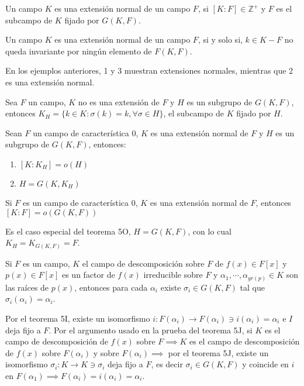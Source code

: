 \begin{definicion}
    Un campo $K$ es una extensión normal de un campo $F$, si $[K:F]\in \mathbb{Z}^+$ y $F$ es el subcampo de $K$ fijado por $G(K,F)$.
\end{definicion}

\begin{prop}
    Un campo $K$ es una extensión normal de un campo $F$, si y solo si, $k\in K-F$ no queda invariante por ningún elemento de $F(K,F)$. 
\end{prop}
\begin{ejemplo}
    En los ejemplos anteriores, 1 y 3 muestran extensiones normales, mientras que 2 es una extensión normal. 
\end{ejemplo}
\begin{cajita}
    Sea $F$ un campo, $K$ no es una extensión de $F$ y $H$ es un subgrupo de $G(K,F)$, entonces $K_H=\{k\in K:\sigma(k)=k,\forall \sigma \in H\}$, el subcampo de $K$ fijado por $H$. 
\end{cajita}

\begin{teorema}[5O]
    Sean $F$ un campo de característica 0, $K$ es una extensión normal de $F$ y $H$ es un subgrupo de $G(K,F)$, entonces: 
    \begin{enumerate}
        \item $[K:K_H]=o(H)$
        \item $H=G(K,K_H)$
    \end{enumerate}
    \begin{dem}
        
    \end{dem}
\end{teorema}

\begin{corolario}
    Si $F$ es un campo de característica 0, $K$ es una extensión normal de $F$, entonces $[K:F]=o(G(K,F))$
    \begin{dem}
        Es el caso especial del teorema 5O, $H=G(K,F)$, con lo cual $K_H=K_{G(K,F)}=F$.
    \end{dem}
\end{corolario}

\begin{lema}[5.9]
    Si $F$ es un campo, $K$ el campo de descomposición sobre $F$ de $f(x)\in F[x]$ y $p(x)\in F[x]$ es un factor de $f(x)$ irreducible sobre $F$ y $\alpha_1,\cdots,\alpha_{gr(p)}\in K$ son las raíces de $p(x)$, entonces para cada $\alpha_i$ existe $\sigma_i\in G(K,F)$ tal que $\sigma_i(\alpha_i)=\alpha_i$.
    \begin{dem}
        Por el teorema 5I, existe un isomorfismo $i:F(\alpha_i)\to F(\alpha_i)\ni i(\alpha_i)=\alpha_i$ e $I$ deja fijo a $F$. Por el argumento usado en la prueba del teorema 5J, si $K$ es el campo de descomposición de $f(x)$ sobre $F\implies K$ es el campo de descomposición de $f(x)$ sobre $F(\alpha_i)$ y sobre $F(\alpha_i)\implies$ por el teorema 5J, existe un isomorfismo $\sigma_i:K\to K\ni \sigma_i$ deja fijo a $F$, es decir $\sigma_i\in G(K,F)$ y coincide en $i$ en $F(\alpha_1)\implies F(\alpha_i)=i(\alpha_i)=\alpha_i$.
    \end{dem}
\end{lema}

